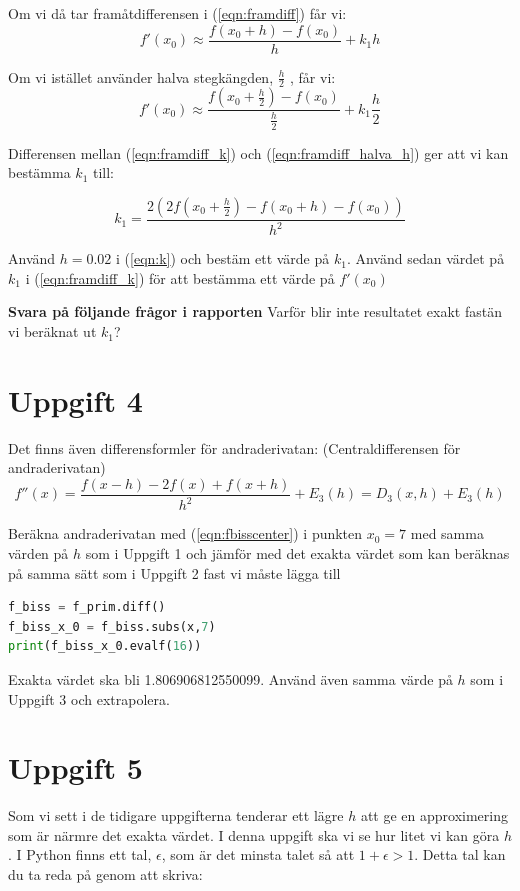 \documentclass[a4paper]{article}
\begin{document}
Om vi då tar framåtdifferensen i (\ref{eqn:framdiff}) får vi:
\begin{equation} \label{eqn:framdiff_k}
  f'(x_0)\approx \frac{f(x_0+h)-f(x_0)}{h}+k_1h
\end{equation}

Om vi istället använder halva stegkängden, \( \frac{h}{2} \) , får vi:
\begin{equation} \label{eqn:framdiff_halva_h}
  f'(x_0)\approx \frac{f(x_0+\frac{h}{2})-f(x_0)}{\frac{h}{2}}+k_1 \frac{h}{2}
\end{equation}

Differensen mellan (\ref{eqn:framdiff_k}) och (\ref{eqn:framdiff_halva_h}) ger att vi kan bestämma \( k_1 \) till:

\begin{equation} \label{eqn:k}
  k_1=\frac{2\left(2f\left(x_0+\frac{h}{2}\right)-f\left(x_0+h\right)-f\left(x_0\right)\right)}{h^2}
\end{equation}

Använd \( h=0.02 \) i (\ref{eqn:k}) och bestäm ett värde på \( k_1 \). Använd sedan värdet på \( k_1 \) i (\ref{eqn:framdiff_k})
för att bestämma ett värde på \( f'(x_0) \)

\textbf{Svara på följande frågor i rapporten}
Varför blir inte resultatet exakt fastän vi beräknat ut \( k_1 \)?

\section{Uppgift 4}
Det finns även differensformler för andraderivatan: (Centraldifferensen för andraderivatan)
\begin{equation} \label{eqn:fbisscenter}
  f''(x)=\frac{f(x-h)-2f(x)+f(x+h)}{h^2}+E_3(h)=D_3(x,h)+E_3(h)
\end{equation}

Beräkna andraderivatan med (\ref{eqn:fbisscenter}) i punkten \( x_0=7 \)  med samma värden på
\( h  \)  som i Uppgift 1 och jämför med det exakta värdet som kan beräknas på samma sätt som
i Uppgift 2 fast vi måste lägga till

\begin{lstlisting}[language=Python]
f_biss = f_prim.diff()
f_biss_x_0 = f_biss.subs(x,7)
print(f_biss_x_0.evalf(16))
\end{lstlisting}

Exakta värdet ska bli 1.806906812550099. Använd även samma värde på \(h\)  som i Uppgift 3
och extrapolera.

\section{Uppgift 5} 
Som vi sett i de tidigare uppgifterna tenderar ett lägre \(h\) att ge en approximering som är närmre det exakta värdet.
I denna uppgift ska vi se hur litet vi kan göra \(h\). I Python finns ett tal, \(\epsilon\), som är det minsta talet så att \(1+\epsilon>1\). Detta tal kan du ta reda på genom att skriva:
\end{document}
